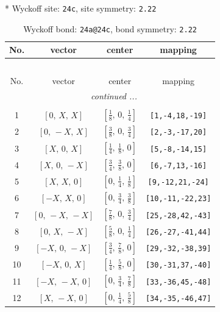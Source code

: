 \documentclass[fleqn,8pt]{jsarticle}
\begin{document}
* Wyckoff site: {\tt 24c}, site symmetry: {\tt 2.22}
\renewcommand{\arraystretch}{1.2}
\begin{longtable}{cccc}
\caption{Wyckoff bond: {\tt 24a@24c}, bond symmetry: {\tt 2.22}}
 \\
 \hline \hline
No. & vector & center & mapping \\ \hline \endfirsthead

\multicolumn{3}{l}{\tablename\ \thetable{}} \\
 \hline \hline
No. & vector & center & mapping \\ \hline \endhead

 \hline \hline
\multicolumn{3}{r}{\footnotesize\it continued ...} \\ \endfoot

 \hline \hline
\multicolumn{3}{r}{} \\ \endlastfoot

1 & $\left[ 0,\, X,\, X \right]$ & $\left[ \frac{1}{8},\, 0,\, \frac{1}{4} \right]$ & {\tt [1,-4,18,-19]} \\ \hline
2 & $\left[ 0,\, - X,\, X \right]$ & $\left[ \frac{3}{8},\, 0,\, \frac{3}{4} \right]$ & {\tt [2,-3,-17,20]} \\ \hline
3 & $\left[ X,\, 0,\, X \right]$ & $\left[ \frac{1}{4},\, \frac{1}{8},\, 0 \right]$ & {\tt [5,-8,-14,15]} \\ \hline
4 & $\left[ X,\, 0,\, - X \right]$ & $\left[ \frac{3}{4},\, \frac{3}{8},\, 0 \right]$ & {\tt [6,-7,13,-16]} \\ \hline
5 & $\left[ X,\, X,\, 0 \right]$ & $\left[ 0,\, \frac{1}{4},\, \frac{1}{8} \right]$ & {\tt [9,-12,21,-24]} \\ \hline
6 & $\left[ - X,\, X,\, 0 \right]$ & $\left[ 0,\, \frac{3}{4},\, \frac{3}{8} \right]$ & {\tt [10,-11,-22,23]} \\ \hline
7 & $\left[ 0,\, - X,\, - X \right]$ & $\left[ \frac{7}{8},\, 0,\, \frac{3}{4} \right]$ & {\tt [25,-28,42,-43]} \\ \hline
8 & $\left[ 0,\, X,\, - X \right]$ & $\left[ \frac{5}{8},\, 0,\, \frac{1}{4} \right]$ & {\tt [26,-27,-41,44]} \\ \hline
9 & $\left[ - X,\, 0,\, - X \right]$ & $\left[ \frac{3}{4},\, \frac{7}{8},\, 0 \right]$ & {\tt [29,-32,-38,39]} \\ \hline
10 & $\left[ - X,\, 0,\, X \right]$ & $\left[ \frac{1}{4},\, \frac{5}{8},\, 0 \right]$ & {\tt [30,-31,37,-40]} \\ \hline
11 & $\left[ - X,\, - X,\, 0 \right]$ & $\left[ 0,\, \frac{3}{4},\, \frac{7}{8} \right]$ & {\tt [33,-36,45,-48]} \\ \hline
12 & $\left[ X,\, - X,\, 0 \right]$ & $\left[ 0,\, \frac{1}{4},\, \frac{5}{8} \right]$ & {\tt [34,-35,-46,47]} \\
\end{longtable}
\end{document}
